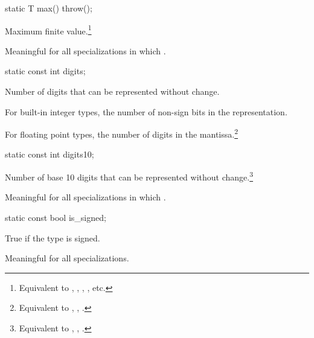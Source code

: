 \begin{itemdecl}
static T max() throw();
\end{itemdecl}

\begin{itemdescr}
\pnum
Maximum finite value.\footnote{Equivalent to , ,
, , etc.}

\pnum
Meaningful for all specializations in which
.
\end{itemdescr}

\begin{itemdecl}
static const int  digits;
\end{itemdecl}

\begin{itemdescr}
\pnum
Number of
digits that can be represented without change.

\pnum
For built-in integer types, the number of non-sign bits in the representation.

\pnum For floating point types, the number of  digits in the
mantissa.\footnote{Equivalent to , ,
.} \end{itemdescr}

\begin{itemdecl}
static const int  digits10;
\end{itemdecl}

\begin{itemdescr}
\pnum
Number of base 10 digits that can be represented without
change.\footnote{Equivalent to , ,
.}

\pnum
Meaningful for all specializations in which
.
\end{itemdescr}

\begin{itemdecl}
static const bool is_signed;
\end{itemdecl}

\begin{itemdescr}
\pnum
True if the type is signed.

\pnum
Meaningful for all specializations.
\end{itemdescr}

